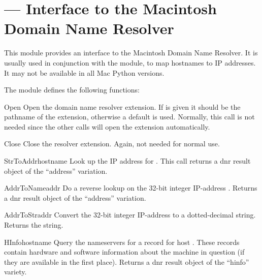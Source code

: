 \section{ ---
         Interface to the Macintosh Domain Name Resolver}



This module provides an interface to the Macintosh Domain Name
Resolver.  It is usually used in conjunction with the 
module, to map hostnames to IP addresses.  It may not be available in
all Mac Python versions.

The  module defines the following functions:


\begin{funcdesc}{Open}{}
Open the domain name resolver extension.  If  is given it
should be the pathname of the extension, otherwise a default is
used.  Normally, this call is not needed since the other calls will
open the extension automatically.
\end{funcdesc}

\begin{funcdesc}{Close}{}
Close the resolver extension.  Again, not needed for normal use.
\end{funcdesc}

\begin{funcdesc}{StrToAddr}{hostname}
Look up the IP address for .  This call returns a dnr
result object of the ``address'' variation.
\end{funcdesc}

\begin{funcdesc}{AddrToName}{addr}
Do a reverse lookup on the 32-bit integer IP-address
.  Returns a dnr result object of the ``address'' variation.
\end{funcdesc}

\begin{funcdesc}{AddrToStr}{addr}
Convert the 32-bit integer IP-address  to a dotted-decimal
string.  Returns the string.
\end{funcdesc}

\begin{funcdesc}{HInfo}{hostname}
Query the nameservers for a  record for host
.  These records contain hardware and software
information about the machine in question (if they are available in
the first place).  Returns a dnr result object of the ``hinfo''
variety.
\end{funcdesc}

